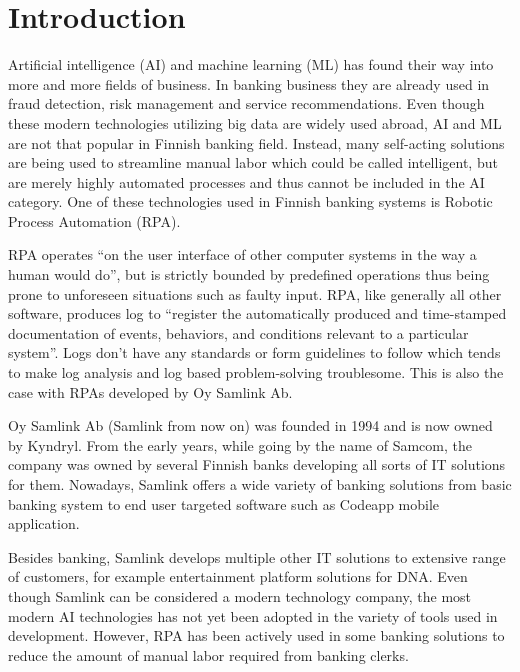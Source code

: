 

\section{Introduction}\label{sec:introduction}

\thispagestyle{empty}
Artificial intelligence (AI) and machine learning (ML)
has found their way into
more and more fields of business.
In banking business they are already used in
fraud detection, risk management and service recommendations.\cite{donepudi2017machine}
Even though these
modern technologies utilizing big data
are widely used abroad,
AI and ML are not that popular in Finnish banking field.
Instead,
many self-acting solutions are being used
to streamline manual labor
which could be called intelligent,
but are merely highly automated processes
and thus cannot be included in the AI category.
One of these technologies used in Finnish banking systems
is Robotic Process Automation (RPA).

RPA operates \enquote{on the user interface of other computer systems
in the way a human would do},\cite{van2018robotic}
but is strictly bounded by predefined operations
thus being prone to unforeseen situations
such as faulty input.
RPA, like generally all other software,
produces log to \enquote{register
the automatically produced and time-stamped documentation
of events, behaviors, and conditions
relevant to a particular system}\cite{delarosa2018log}.
Logs don't have any standards or form guidelines to follow
which tends to make
log analysis and log based problem-solving troublesome.
This is also the case with RPAs developed by Oy Samlink Ab.

Oy Samlink Ab (Samlink from now on)
was founded in 1994
and is now owned by Kyndryl.
From the early years,
while going by the name of Samcom,
the company was owned by several Finnish banks
developing all sorts of IT solutions for them.
Nowadays,
Samlink offers a wide variety of banking solutions
from basic banking system to end user targeted software
such as Codeapp mobile application.

Besides banking,
Samlink develops multiple other IT solutions
to extensive range of customers,
for example
entertainment platform solutions for DNA\@.
Even though Samlink can be considered
a modern technology company,
the most modern AI technologies has not yet been adopted
in the variety of tools used in development.
However,
RPA has been actively used
in some banking solutions
to reduce the amount of manual labor required
from banking clerks.

